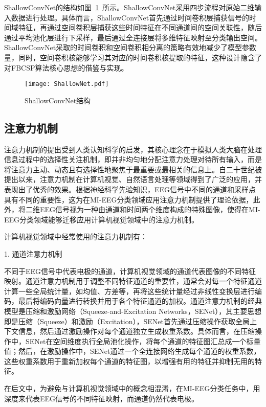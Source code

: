ShallowConvNet的结构如图~\ref{fig:ShallowConvNet}~所示。ShallowConvNet采用四步流程对原始二维输入数据进行处理。具体而言，ShallowConvNet首先通过时间卷积层捕获信号的时间域特征，再通过空间卷积层捕获这些时间特征在不同通道间的空间关联性，随后通过平均池化层进行下采样，最后通过全连接层将多维特征映射至分类输出空间。ShallowConvNet采取的时间卷积和空间卷积相分离的策略有效地减少了模型参数量，同时，空间卷积核能够学习其对应的时间卷积核提取的特征，这种设计隐含了对FBCSP算法核心思想的借鉴与实现。
\begin{figure}
    \centering
    \texttt{[image: ShallowNet.pdf]}
    \caption{ShallowConvNet结构}
    \label{fig:ShallowConvNet}
\end{figure}

\subsection{注意力机制}

注意力机制的提出受到人类认知科学的启发，其核心理念在于模拟人类大脑在处理信息过程中的选择性关注机制，即并非均匀地分配注意力处理对待所有输入，而是将注意力主动、动态且有选择性地聚焦于最重要或最相关的信息上。自二十世纪被提出以来\cite{730558}，注意力机制在计算机视觉、自然语言处理等领域得到了广泛的应用，并表现出了优秀的效果。根据神经科学先验知识，EEG信号中不同的通道和采样点具有不同的重要性，这为在MI-EEG分类领域应用注意力机制提供了理论依据，此外，将二维EEG信号视为一种由通道和时间两个维度构成的特殊图像，使得在MI-EEG分类领域能够迁移应用计算机视觉领域中的注意力机制。

计算机视觉领域中经常使用的注意力机制有：

1. 通道注意力机制
    
不同于EEG信号中代表电极的通道，计算机视觉领域的通道代表图像的不同特征映射。通道注意力机制用于调整不同特征通道的重要性，通常会对每一个特征通道计算一些全局统计量，如均值、方差等，再将这些统计量经过非线性变换层进行编码，最后将编码向量进行转换并用于各个特征通道的加权。通道注意力机制的经典模型是压缩和激励网络（Squeeze-and-Excitation Networks，SENet）\cite{8578843}，其主要思想即是压缩（Squeeze）和激励（Excitation），SENet首先通过压缩操作获取全局上下文信息，然后通过激励操作对每个通道独立生成权重系数。具体而言，在压缩操作中，SENet在空间维度执行全局池化操作，将每个通道的特征图汇总成一个标量值；然后，在激励操作中，SENet通过一个全连接网络生成每个通道的权重系数，这些权重系数用于重新加权每个通道的特征图，以增强有用的特征并抑制无用的特征。

在后文中，为避免与计算机视觉领域中的概念相混淆，在MI-EEG分类任务中，用深度来代表EEG信号的不同特征映射，而通道仍然代表电极。

